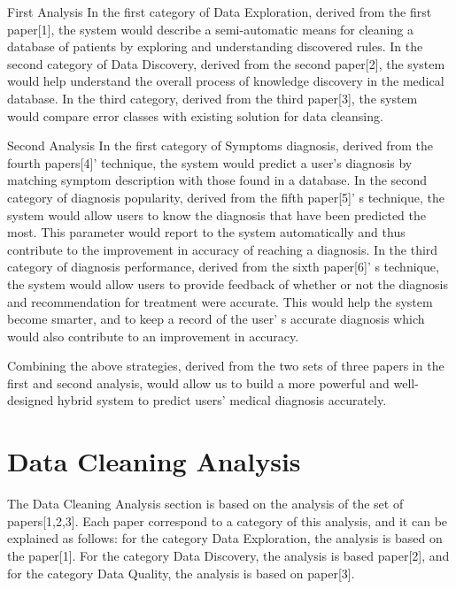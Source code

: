 \documentclass[sts]{sig-alternate}
\begin{document}
	\begin{description}
  		\item\normalfont First Analysis \newline
  			In the first category of Data Exploration, derived from the first paper[1], the system would 			describe a semi-automatic means for cleaning a database of patients by exploring and 						understanding discovered rules. In the second category of Data Discovery, derived from the 				second paper[2], the system  would help understand the overall process of knowledge 						discovery in the medical database. In the third category, derived from the third paper[3], 				the system would compare error classes with existing solution  for data cleansing.
  					
  		\item\normalfont Second Analysis \newline
  			In the first category of Symptoms diagnosis, derived from the fourth papers[4]' technique, 				the 	system 	would predict a user's diagnosis by matching symptom description with those 					found in a database. In the second category of diagnosis popularity, derived from the fifth 				paper[5]' s 	technique, the system would allow users to know the diagnosis that have been 					predicted the most. This parameter would report to the system automatically and thus 						contribute to the improvement in accuracy of reaching a diagnosis. In the third category of 				diagnosis performance, derived from the sixth paper[6]' s technique, the system would allow 				users to provide feedback of whether or not the diagnosis and recommendation for treatment 				were accurate. This would help the system become smarter, and to keep a record of the user' 				s accurate diagnosis which would also contribute to an improvement in accuracy.		
	\end{description}
	
	Combining the above strategies, derived from the two sets of three papers in the first and second 		analysis, would allow us to build a more powerful and well-designed hybrid system to predict users' 		medical 	diagnosis accurately.

\section{Data Cleaning Analysis}
	\label{Data Cleaning Analysis}
	
	The Data Cleaning Analysis section is based on the analysis of the set of papers[1,2,3]. Each paper 		correspond to a category of this analysis, and it can be explained as follows: for the category Data 	Exploration, the analysis is based on the paper[1]. For the category Data Discovery, the analysis is 	based paper[2], and for the category Data Quality, the analysis is based on paper[3].
		
\end{document}
